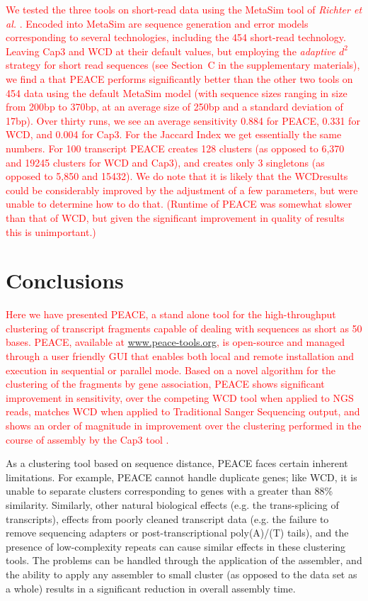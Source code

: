 \documentclass[a4,center,fleqn]{NAR}
\newcommand{\mc}[1]{\textcolor{red}{#1}}
\newcommand{\peace} {{\small PEACE}}
\newcommand{\wcd} {{\small WCD}}
\newcommand{\capthree} {{\small Cap3}}
\newcommand{\metasim} {{\small MetaSim}}
\begin{document}
\mc{We tested the three tools on short-read data using the \metasim\/
  tool of {\it Richter et al.} \cite{Richter2008}.  Encoded into
  \metasim\/ are sequence generation and error models corresponding to
  several technologies, including the 454 short-read technology.
  Leaving \capthree\/ and \wcd\/ at their default values, but
  employing the {\it adaptive $d^2$} strategy for short read sequences
  (see Section~C in the supplementary materials), we find a that
  \peace\/ performs significantly better than the other two tools on
  454 data using the default \metasim\/ model (with sequence sizes
  ranging in size from 200bp to 370bp, at an average size of 250bp and
  a standard deviation of 17bp).  Over thirty runs, we see an average
  sensitivity 0.884 for \peace, 0.331\/ for \wcd, and 0.004 for
  \capthree.  For the Jaccard Index we get essentially the same
  numbers.  For 100 transcript \peace\/ creates 128 clusters (as
  opposed to 6,370 and 19245 clusters for \wcd\/ and \capthree), and
  creates only 3 singletons (as opposed to 5,850 and 15432).  We do
  note that it is likely that the \wcd results could be considerably
  improved by the adjustment of a few parameters, but were unable to
  determine how to do that.  (Runtime of \peace\/ was somewhat slower
  than that of \wcd, but given the significant improvement in quality
  of results this is unimportant.)}

\section{Conclusions}

\mc{Here we have presented \peace, a stand alone tool for the
high-throughput clustering of transcript fragments capable of dealing
with sequences as short as 50 bases.  \peace\/, available at
\href{http://www.peace-tools.org}{www.peace-tools.org}, is open-source
and managed through a user friendly GUI that enables both local and
remote installation and execution in sequential or parallel mode.
Based on a novel algorithm for the clustering of the fragments by gene
association, \peace\/ shows significant improvement in sensitivity,
over the competing \wcd\/ tool \cite{Hazelhurst08a} when applied to
NGS reads, matches \wcd\/ when applied to Traditional Sanger
Sequencing output, and shows an order of magnitude in improvement over
the clustering performed in the course of assembly by the \capthree\/
tool \cite{Huang99}.}

As a clustering tool based on sequence distance, \peace\/ faces
certain inherent limitations. For example, \peace\/ cannot handle
duplicate genes; like \wcd\/, it is unable to separate clusters
corresponding to genes with a greater than 88\% similarity.
Similarly, other natural biological effects (e.g. the trans-splicing of
transcripts), effects from poorly cleaned transcript data (e.g. the
failure to remove sequencing adapters or post-transcriptional
poly(A)/(T) tails), and the presence of low-complexity repeats can
cause similar effects in these clustering tools.  The problems can be
handled through the application of the assembler, and the ability to
apply any assembler to small cluster (as opposed to the data set as a
whole) results in a significant reduction in overall assembly time.
\end{document}
